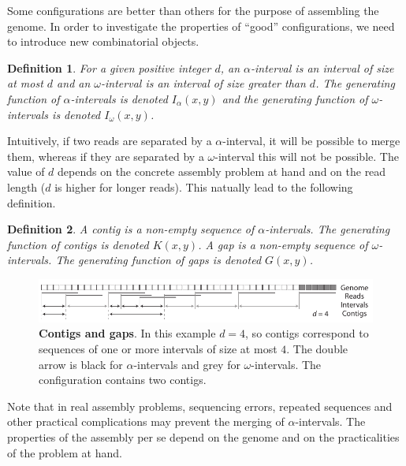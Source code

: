 \documentclass{article}
\newtheorem{definition}{Definition}
\begin{document}

Some configurations are better than others for the purpose of assembling
the genome. In order to investigate the properties of ``good''
configurations, we need to introduce new combinatorial objects.

\begin{definition}
For a given positive integer $d$, an $\alpha$-interval is an interval of
size at most $d$ and an $\omega$-interval is an interval of size greater
than $d$. The generating function of $\alpha$-intervals is denoted
$I_\alpha(x,y)$ and the generating function of $\omega$-intervals is
denoted $I_\omega(x,y)$.
\end{definition}

Intuitively, if two reads are separated by a $\alpha$-interval, it will be
possible to merge them, whereas if they are separated by a
$\omega$-interval this will not be possible. The value of $d$ depends on
the concrete assembly problem at hand and on the read length ($d$ is
higher for longer reads).  This natually lead to the following definition.

\begin{definition}
\label{def:contig}
A contig is a non-empty sequence of $\alpha$-intervals. The generating
function of contigs is denoted $K(x,y)$. A gap is a non-empty sequence of
$\omega$-intervals. The generating function of gaps is denoted $G(x,y)$.
\end{definition}

\begin{figure}[h]
\centering
\includegraphics[scale=0.9]{Fig2.pdf}
\caption{\textbf{Contigs and gaps}. In this example $d=4$, so contigs
correspond to sequences of one or more intervals of size at most $4$. The
double arrow is black for $\alpha$-intervals and grey for
$\omega$-intervals. The configuration contains two contigs.}
\label{fig:contigs}
\end{figure}

Note that in real assembly problems, sequencing errors, repeated sequences
and other practical complications may prevent the merging of
$\alpha$-intervals. The properties of the assembly per se depend on the
genome and on the practicalities of the problem at hand.
\end{document}
